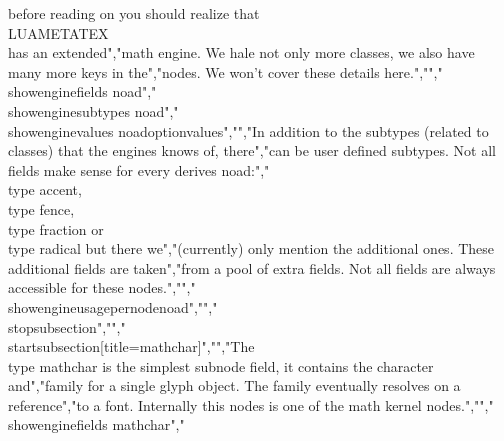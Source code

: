 before reading on you should realize that \\LUAMETATEX\\ has an extended","math engine. We hale not only more classes, we also have many more keys in the","nodes. We won't cover these details here.","","\\showenginefields   {noad}","\\showenginesubtypes {noad}","\\showenginevalues   {noadoptionvalues}","","In addition to the subtypes (related to classes) that the engines knows of, there","can be user defined subtypes. Not all fields make sense for every derives noad:","\\type {accent}, \\type {fence}, \\type {fraction} or \\type {radical} but there we","(currently) only mention the additional ones. These additional fields are taken","from a pool of extra fields. Not all fields are always accessible for these nodes.","","\\showengineusagepernode{noad}","","\\stopsubsection","","\\startsubsection[title=mathchar]","","The \\type {mathchar} is the simplest subnode field, it contains the character and","family for a single glyph object. The family eventually resolves on a reference","to a font. Internally this nodes is one of the math kernel nodes.","","\\showenginefields   {mathchar}","%